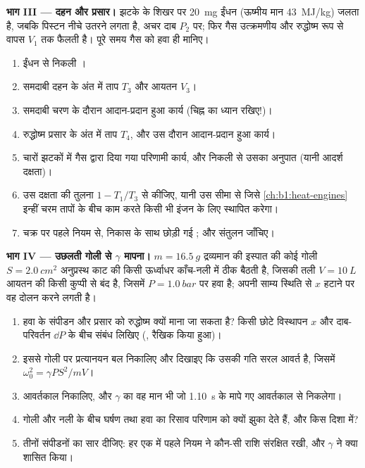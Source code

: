 \begin{problem}
\medskip
\noindent\textbf{भाग III --- दहन और प्रसार।}
झटके के शिखर पर \qty{20}{mg} ईंधन (ऊष्मीय मान \qty{43}{MJ/kg}) जलता है,
जबकि पिस्टन नीचे उतरने लगता है, अचर दाब $P_2$ पर; फिर गैस उत्क्रमणीय और
रुद्धोष्म रूप से वापस $V_1$ तक फैलती है। पूरे समय गैस को हवा ही मानिए।
\begin{enumerate}[resume]
  \item ईंधन से निकली ।
  \item समदाबी दहन के अंत में ताप $T_3$ और आयतन $V_3$।
  \item समदाबी चरण के दौरान आदान-प्रदान हुआ कार्य (चिह्न का ध्यान रखिए!)।
  \item रुद्धोष्म प्रसार के अंत में ताप $T_4$, और उस दौरान आदान-प्रदान
        हुआ कार्य।
  \item चारों झटकों में गैस द्वारा दिया गया परिणामी कार्य, और निकली 
        से उसका अनुपात (यानी आदर्श दक्षता)।
  \item उस दक्षता की तुलना $1 - T_1/T_3$ से कीजिए, यानी उस सीमा से जिसे
        \cref{ch:b1:heat-engines} इन्हीं चरम तापों के बीच काम करते किसी
        भी इंजन के लिए स्थापित करेगा।
  \item चक्र पर पहले नियम से, निकास के साथ छोड़ी गई ; और संतुलन
        जाँचिए।
\end{enumerate}

\medskip
\noindent\textbf{भाग IV --- उछलती गोली से $\gamma$ मापना।}
$m = \qty{16.5}{g}$ द्रव्यमान की इस्पात की कोई गोली
$S = \qty{2.0}{cm^2}$ अनुप्रस्थ काट की किसी ऊर्ध्वाधर काँच-नली में ठीक
बैठती है, जिसकी तली $V = \qty{10}{L}$ आयतन की किसी कुप्पी से बंद है, जिसमें
$P = \qty{1.0}{bar}$ पर हवा है; अपनी साम्य स्थिति से $x$ हटाने पर वह दोलन
करने लगती है।
\begin{enumerate}[resume]
  \item हवा के संपीडन और प्रसार को रुद्धोष्म क्यों माना जा सकता है? किसी
        छोटे विस्थापन $x$ और दाब-परिवर्तन $\dd P$ के बीच संबंध लिखिए
        (, रैखिक किया हुआ)।
  \item इससे गोली पर प्रत्यानयन बल निकालिए और दिखाइए कि उसकी गति सरल आवर्त
        है, जिसमें $\omega_0^2 = \gamma PS^2/mV$।
  \item आवर्तकाल निकालिए, और $\gamma$ का वह मान भी जो \qty{1.10}{s} के मापे
        गए आवर्तकाल से निकलेगा।
  \item गोली और नली के बीच घर्षण तथा हवा का रिसाव परिणाम को क्यों झुका
        देते हैं, और किस दिशा में?
  \item तीनों संपीडनों का सार दीजिए: हर एक में पहले नियम ने कौन-सी राशि
        संरक्षित रखी, और  $\gamma$ ने क्या शासित किया।
\end{enumerate}
\end{problem}
